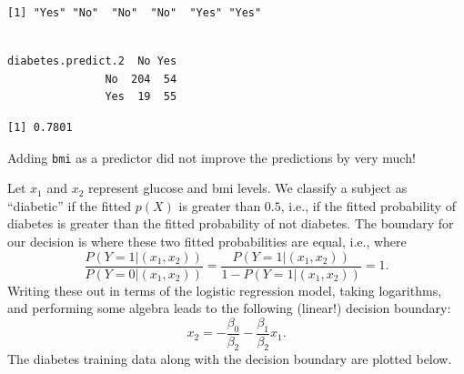 \documentclass[]{krantz}
\makeatletter
\newenvironment{Shaded}{\begin{snugshade}}{\end{snugshade}}
\newcommand{\DecValTok}[1]{\textcolor[rgb]{0.06,0.06,0.06}{#1}}
\newcommand{\FloatTok}[1]{\textcolor[rgb]{0.06,0.06,0.06}{#1}}
\newcommand{\KeywordTok}[1]{\textcolor[rgb]{0.27,0.27,0.27}{\textbf{#1}}}
\newcommand{\NormalTok}[1]{#1}
\newcommand{\OperatorTok}[1]{\textcolor[rgb]{0.43,0.43,0.43}{\textbf{#1}}}
\newcommand{\StringTok}[1]{\textcolor[rgb]{0.5,0.5,0.5}{#1}}
\newenvironment{kframe}{%
\medskip{}
\setlength{\fboxsep}{.8em}
 \def\at@end@of@kframe{}%
 \ifinner\ifhmode%
  \def\at@end@of@kframe{\end{minipage}}%
  \begin{minipage}{\columnwidth}%
 \fi\fi%
 \def\FrameCommand##1{\hskip\@totalleftmargin \hskip-\fboxsep
 \colorbox{shadecolor}{##1}\hskip-\fboxsep
     \hskip-\linewidth \hskip-\@totalleftmargin \hskip\columnwidth}%
 \MakeFramed {\advance\hsize-\width
   \@totalleftmargin\z@ \linewidth\hsize
   \@setminipage}}%
 {\par\unskip\endMakeFramed%
 \at@end@of@kframe}
\renewenvironment{Shaded}{\begin{kframe}}{\end{kframe}}
\makeatother
\begin{document}
\begin{verbatim}
[1] "Yes" "No"  "No"  "No"  "Yes" "Yes"
\end{verbatim}

\begin{Shaded}
\end{Shaded}

\begin{verbatim}
                  
diabetes.predict.2  No Yes
               No  204  54
               Yes  19  55
\end{verbatim}

\begin{Shaded}
\end{Shaded}

\begin{verbatim}
[1] 0.7801
\end{verbatim}

Adding \texttt{bmi} as a predictor did not improve the predictions by very much!

Let \(x_1\) and \(x_2\) represent glucose and bmi levels. We classify a subject as ``diabetic'' if the fitted \(p(X)\) is greater than \(0.5\), i.e., if the fitted probability of diabetes is greater than the fitted probability of not diabetes. The boundary for our decision is where these two fitted probabilities are equal, i.e., where
\[
\frac{P(Y = 1 | (x_1, x_2))}{P(Y = 0 | (x_1, x_2))} = \frac{P(Y = 1 | (x_1, x_2))}{1 - P(Y = 1 | (x_1, x_2))}  = 1.
\]
Writing these out in terms of the logistic regression model, taking logarithms, and performing some algebra leads to the following (linear!) decision boundary:
\[
x_2 = -\frac{\beta_0}{\beta_2} - \frac{\beta_1}{\beta_2} x_1.
\]
The diabetes training data along with the decision boundary are plotted below.
\end{document}
